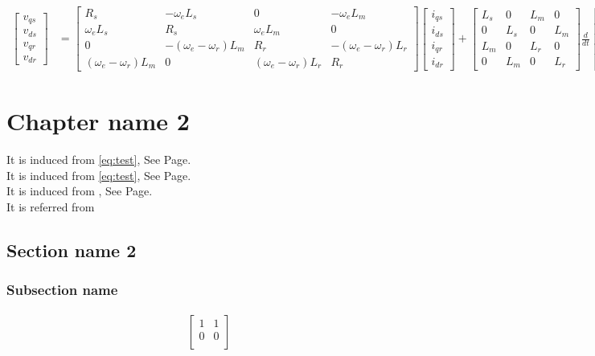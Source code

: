\documentclass[12pt, a4paper]{report}
\begin{document}
\begin{align}
	\begin{bmatrix}
		v_{qs}\\
		v_{ds}\\
		v_{qr}\\
		v_{dr}
	\end{bmatrix}
	&=
	\begin{bmatrix}
		R_s & -\omega_e L_s & 0 & -\omega_e L_m\\
		\omega_e L_s & R_s & \omega_e L_m & 0\\
		0 & -(\omega_e - \omega_r) L_m & R_r & -(\omega_e - \omega_r) L_r\\
		(\omega_e - \omega_r) L_m & 0 & (\omega_e - \omega_r) L_r & R_r
	\end{bmatrix}
	\begin{bmatrix}
		i_{qs}\\
		i_{ds}\\
		i_{qr}\\
		i_{dr}
	\end{bmatrix}
	+
	\begin{bmatrix}
		L_s & 0 & L_m & 0\\
		0 & L_s & 0 & L_m\\
		L_m & 0 & L_r & 0\\
		0 & L_m & 0 & L_r
	\end{bmatrix}
	\frac{d}{dt}
	\begin{bmatrix}
		i_{qs}\\
		i_{ds}\\
		i_{qr}\\
		i_{dr}
	\end{bmatrix}
\end{align}


\chapter{Chapter name 2}
It is induced from \eqref{eq:test}, See Page. \pageref{eq:test} \\
It is induced from \cref{eq:test}, See Page. \pageref{eq:test} \\
It is induced from , See Page. \pageref{eq:test} \\
It is referred from \cite{bocker2007state}


\section{Section name 2}

\subsection{Subsection name}

\begin{align}
	\begin{bmatrix}
		1 & 1 \\
		0 & 0 \\
	\end{bmatrix}
\end{align}






\end{document}

